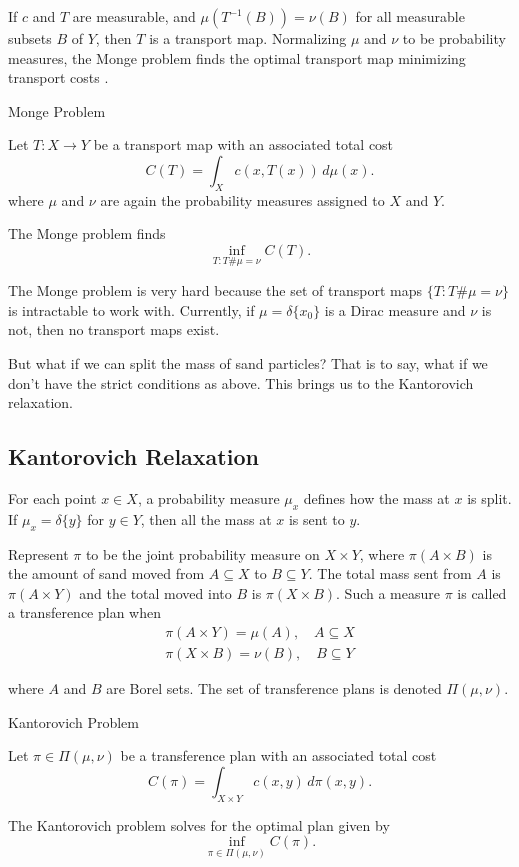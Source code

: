 If $c$ and $T$ are measurable, and $\mu(T^{-1}(B))=\nu(B)$ for all measurable subsets $B$ of $Y$, then $T$ is a transport map. Normalizing $\mu$ and $\nu$ to be probability measures, the Monge problem finds the optimal transport map minimizing transport costs \cite{Panaretos2020}. 

\begin{definition}{Monge Problem}
	
	Let $T:X\to Y$ be a transport map with an associated total cost \[
	C(T) = \int_{X} c(x,T(x)) \,d\mu(x).
	\] where $\mu$ and $\nu$ are again the probability measures assigned to $X$ and $Y$.
	
	The Monge problem finds
	\[
	\inf_{T:T\#\mu=\nu} C(T).
	\]
\end{definition}

The Monge problem is very hard because the set of transport maps $\{T:T\#\mu = \nu\}$ is intractable to work with. Currently, if $\mu=\delta\{x_0\}$ is a Dirac measure and $\nu$ is not, then no transport maps exist.

But what if we can split the mass of sand particles? That is to say, what if we don't have the strict conditions as above. This brings us to the Kantorovich relaxation.

\subsection*{Kantorovich Relaxation}
For each point $x\in X$, a probability measure $\mu_x$ defines how the mass at $x$ is split. If $\mu_x = \delta\{y\}$ for $y\in Y$, then all the mass at $x$ is sent to $y$.

Represent $\pi$ to be the joint probability measure on $X\times Y$, where $\pi(A\times B)$ is the amount of sand moved from $A\subseteq X$ to $B\subseteq Y$. The total mass sent from $A$ is $\pi(A\times Y)$ and the total moved into $B$ is $\pi(X\times B)$. Such a measure $\pi$ is called a  transference plan when
\begin{align*}
\pi(A\times Y) = \mu(A),\quad A\subseteq X \\
\pi(X\times B) = \nu(B),\quad B\subseteq Y
\end{align*}

where $A$ and $B$ are Borel sets. The set of transference plans is denoted $\Pi(\mu,\nu)$.

\begin{definition}{Kantorovich Problem}
	
	Let $\pi\in \Pi(\mu,\nu)$ be a transference plan with an associated total cost \[
	C(\pi) = \int_{X\times Y} c(x,y) \,d\pi(x,y).
	\]
	
	The Kantorovich problem solves for the optimal plan given by
	\[
	\inf_{\pi\in \Pi(\mu,\nu)} C(\pi).
	\]
\end{definition}

